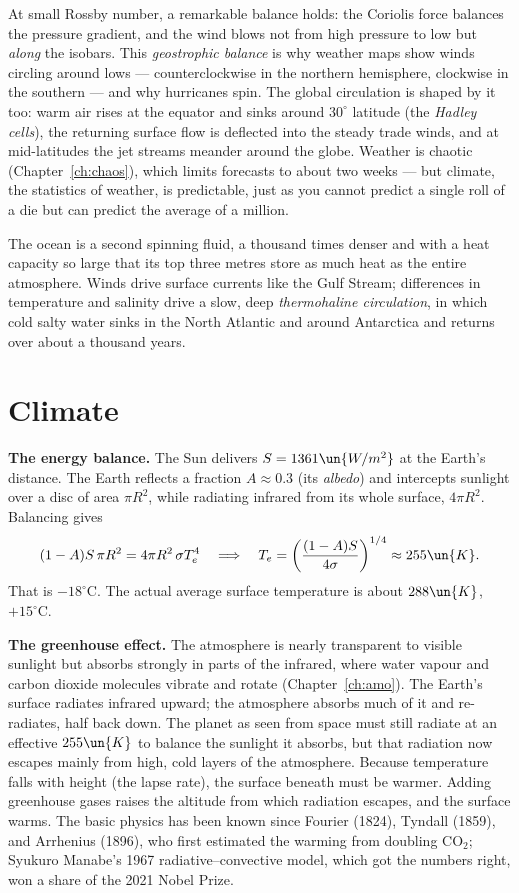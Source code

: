 At small Rossby number, a remarkable balance holds: the Coriolis force balances the pressure gradient, and the wind blows not from high pressure to low but \emph{along} the isobars. This \emph{geostrophic balance} is why weather maps show winds circling around lows --- counterclockwise in the northern hemisphere, clockwise in the southern --- and why hurricanes spin. The global circulation is shaped by it too: warm air rises at the equator and sinks around $30^\circ$ latitude (the \emph{Hadley cells}), the returning surface flow is deflected into the steady trade winds, and at mid-latitudes the jet streams meander around the globe. Weather is chaotic (Chapter~\ref{ch:chaos}), which limits forecasts to about two weeks --- but climate, the statistics of weather, is predictable, just as you cannot predict a single roll of a die but can predict the average of a million.

The ocean is a second spinning fluid, a thousand times denser and with a heat capacity so large that its top three metres store as much heat as the entire atmosphere. Winds drive surface currents like the Gulf Stream; differences in temperature and salinity drive a slow, deep \emph{thermohaline circulation}, in which cold salty water sinks in the North Atlantic and around Antarctica and returns over about a thousand years.

\section{Climate}

\textbf{The energy balance.} The Sun delivers $S = 1361\un{W/m^2}$ at the Earth's distance. The Earth reflects a fraction $A\approx0.3$ (its \emph{albedo}) and intercepts sunlight over a disc of area $\pi R^2$, while radiating infrared from its whole surface, $4\pi R^2$. Balancing gives
\[
  (1-A)S\,\pi R^2 = 4\pi R^2\,\sigma T_e^4 \quad\Longrightarrow\quad T_e = \left(\frac{(1-A)S}{4\sigma}\right)^{1/4}\approx255\un{K} .
\]
That is $-18^\circ\text{C}$. The actual average surface temperature is about $288\un{K}$, $+15^\circ\text{C}$.

\textbf{The greenhouse effect.} The atmosphere is nearly transparent to visible sunlight but absorbs strongly in parts of the infrared, where water vapour and carbon dioxide molecules vibrate and rotate (Chapter~\ref{ch:amo}). The Earth's surface radiates infrared upward; the atmosphere absorbs much of it and re-radiates, half back down. The planet as seen from space must still radiate at an effective $255\un{K}$ to balance the sunlight it absorbs, but that radiation now escapes mainly from high, cold layers of the atmosphere. Because temperature falls with height (the lapse rate), the surface beneath must be warmer. Adding greenhouse gases raises the altitude from which radiation escapes, and the surface warms. The basic physics has been known since Fourier (1824), Tyndall (1859), and Arrhenius (1896), who first estimated the warming from doubling CO$_2$; Syukuro Manabe's 1967 radiative--convective model, which got the numbers right, won a share of the 2021 Nobel Prize.

